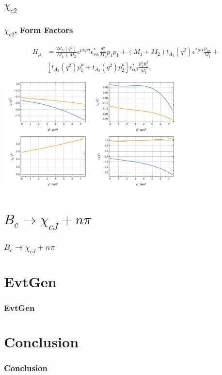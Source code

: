 \documentclass{beamer}
\begin{document}
\subsection{$\chi_{c2}$}
\begin{frame}
  \frametitle{$\chi_{c2}$, Form Factors}
  \begin{align*}
  H_\mu &=
\frac{2it_V(q^2)}{M_1+M_2} \epsilon^{\mu\nu\rho\sigma}\epsilon^*_{\nu\alpha}
          \frac{p_1^\alpha}{M_1}  p_1 p_1  
     +  (M_1+M_2)t_{A_1}(q^2)\epsilon^{*\mu\alpha}\frac{p_{1\alpha}}{M_1} +\\
&  [t_{A_2}(q^2)p_1^\mu+t_{A_3}(q^2)p_2^\mu]\epsilon^*_{\alpha\beta}
\frac{p_1^\alpha p_1^\beta}{M_1^2} , 
  \end{align*}

\begin{center}
  \includegraphics[width=0.7\textwidth]{figs/ff_chi_c2}
\end{center}
\end{frame}



  
\section{$B_c\to \chi_{cJ}+n\pi$}
\begin{frame}
  \frametitle{$B_c\to \chi_{cJ}+n\pi$}
\end{frame}

\section{EvtGen}
\begin{frame}
  \frametitle{EvtGen}
\end{frame}


\section{Conclusion}
\begin{frame}
  \frametitle{Conclusion}
\end{frame}
\end{document}
